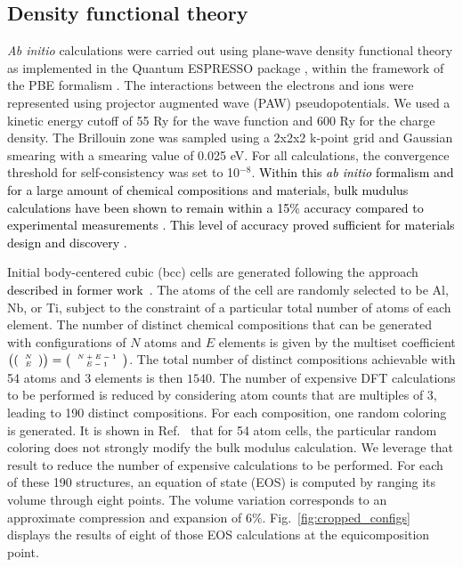 \documentclass[%
 reprint,
aip,jcp
]{revtex4-1}
\newcommand{\review}[1]{\textcolor{black}{#1}}
\begin{document}
\subsection{Density functional theory}
\label{subsec:DFTsimulations}

\emph{Ab initio} calculations were carried out using plane-wave 
density functional theory as implemented in the Quantum ESPRESSO 
package \cite{giannozzi2009quantum,giannozzi2017advanced}, within the 
framework of the PBE formalism \cite{perdew1996generalized}. 
The interactions between the electrons and ions were represented using 
projector augmented wave (PAW) pseudopotentials.
We used a kinetic energy cutoff of 55 Ry for the wave function and 600 Ry 
for the charge density. 
The Brillouin zone was sampled using a 2x2x2 k-point grid and
Gaussian smearing with a smearing value of 0.025 eV.
For all calculations, the convergence threshold for
self-consistency was set to 10$^{-8}$.
\review{
Within this \emph{ab initio} formalism and for a large amount of chemical
compositions and materials, bulk mudulus calculations have been shown to 
remain within a 15\% accuracy compared to experimental 
measurements \cite{tran2016rungs}.  
This level of accuracy proved sufficient for materials design and
discovery \cite{saal2013materials}. 
}

Initial body-centered cubic (bcc) cells are generated following the
approach \review{described in former work~\cite{tranchida2020AlNbTi_SNAP}.}
The atoms of the cell are randomly selected to be Al, Nb, or Ti, subject 
to the constraint of a particular total number of atoms of each element.
The number of distinct chemical compositions that can be generated 
with configurations of $N$ atoms and $E$ elements is given by the 
multiset coefficient $\left (( \tiny\begin{array}{c} N \\ E \end{array} ) \right ) = \left ( \tiny\begin{array}{c} N+E-1 \\ E-1 \end{array} \right )$.
The total number of distinct compositions achievable with 54 atoms and 
3 elements is then $1540$.
The number of expensive DFT calculations to be performed is reduced by
considering atom counts that are multiples of 3, leading to 190 distinct
compositions.
For each composition, one random coloring is generated. 
It is shown in Ref.~\cite{tranchida2020AlNbTi_SNAP} that for 54 atom 
cells, the particular random coloring does not strongly modify the bulk modulus
calculation. We leverage that result to reduce the number of expensive 
calculations to be performed.
For each of these 190 structures, an equation of state (EOS) is computed 
by ranging its 
volume through eight points. The volume variation corresponds to an
approximate compression and expansion of $6\%$.
Fig.~\ref{fig:cropped_configs} displays the results of eight of those
EOS calculations at the equicomposition point.
\end{document}
